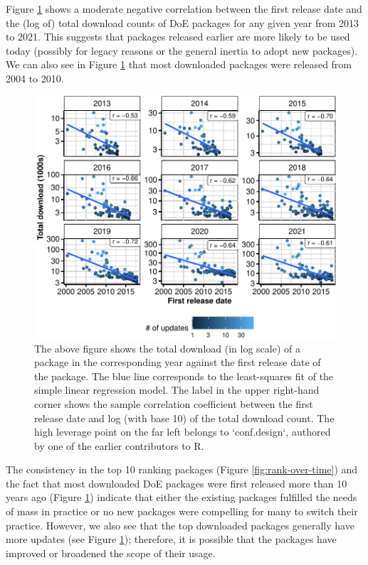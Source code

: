 \documentclass{article}
\begin{document}
Figure \ref{fig:release-date-vs-download} shows a moderate negative
correlation between the first release date and the (log of) total
download counts of DoE packages for any given year from 2013 to 2021.
This suggests that packages released earlier are more likely to be used
today (possibly for legacy reasons or the general inertia to adopt new
packages). We can also see in Figure \ref{fig:release-date-vs-download}
that most downloaded packages were released from 2004 to 2010.

\begin{figure}[htbp]

{\centering \includegraphics{figures/release-date-vs-download-1} 

}

\caption{The above figure shows the total download (in log scale) of a package in the corresponding year against the first release date of the package. The blue line corresponds to the least-squares fit of the simple linear regression model. The label in the upper right-hand corner shows the sample correlation coefficient between the first release date and log (with base 10) of the total download count. The high leverage point on the far left belongs to `conf.design`, authored by one of the earlier contributors to R.}\label{fig:release-date-vs-download}
\end{figure}

The consistency in the top 10 ranking packages (Figure
\ref{fig:rank-over-time}) and the fact that most downloaded DoE packages
were first released more than 10 years ago (Figure
\ref{fig:release-date-vs-download}) indicate that either the existing
packages fulfilled the needs of mass in practice or no new packages were
compelling for many to switch their practice. However, we also see that
the top downloaded packages generally have more updates (see Figure
\ref{fig:release-date-vs-download}); therefore, it is possible that the
packages have improved or broadened the scope of their usage.
\end{document}
